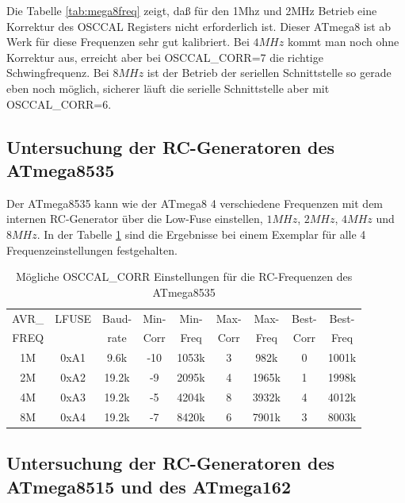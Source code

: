 Die Tabelle \ref{tab:mega8freq} zeigt, daß für den 1Mhz und 2MHz Betrieb eine Korrektur des
OSCCAL Registers nicht erforderlich ist. Dieser ATmega8 ist ab Werk für diese Frequenzen sehr gut kalibriert.
Bei \(4MHz\) kommt man noch ohne Korrektur aus, erreicht aber bei OSCCAL\_CORR=7 die richtige
Schwingfrequenz. Bei \(8MHz\) ist der Betrieb der seriellen Schnittstelle so gerade eben
noch möglich, sicherer läuft die serielle Schnittstelle aber mit OSCCAL\_CORR=6.

\subsection{Untersuchung der RC-Generatoren des ATmega8535}

Der ATmega8535 kann wie der ATmega8 4 verschiedene Frequenzen mit dem internen RC-Generator
über die Low-Fuse einstellen, \(1MHz\), \(2MHz\), \(4MHz\) und \(8MHz\).
In der Tabelle \ref{tab:mega8535freq} sind die Ergebnisse bei einem Exemplar für
 alle 4 Frequenzeinstellungen festgehalten.

\begin{table}[H]
  \begin{center}
    \begin{tabular}{| c | c | c || c | c || c | c || c | c |}
    \hline
             AVR\_ & LFUSE & Baud- & Min- & Min- & Max- & Max- & Best- & Best-  \\
             FREQ  &       & rate & Corr & Freq & Corr & Freq  & Corr  & Freq  \\
    \hline
    \hline
                1M & 0xA1  &  9.6k &  -10  & 1053k &  3  & 982k  & 0  & 1001k \\
    \hline
                2M & 0xA2  & 19.2k &  -9  & 2095k &  4  & 1965k & 1  & 1998k \\
    \hline
                4M & 0xA3  & 19.2k &  -5  & 4204k &  8  & 3932k & 4  & 4012k \\
    \hline
                8M & 0xA4  & 19.2k &  -7  & 8420k &  6  & 7901k & 3  & 8003k \\
    \hline
    \end{tabular}
  \end{center}
  \caption{Mögliche OSCCAL\_CORR Einstellungen für die RC-Frequenzen des ATmega8535}
  \label{tab:mega8535freq}
\end{table}

\subsection{Untersuchung der RC-Generatoren des ATmega8515 und des ATmega162}

